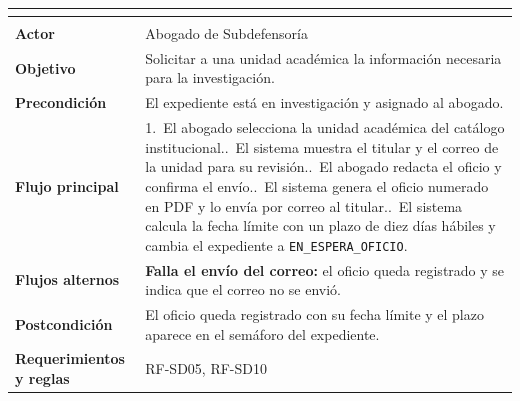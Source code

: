 \begingroup
{}
\small
\renewcommand{\arraystretch}{1.25}
\setlength{\tabcolsep}{4pt}
\begin{longtable}{|L{3.2cm}|L{12.4cm}|}
	\hline
	 \\
	\hline
	\endfirsthead
	\hline
	 \\
	\hline
	\endhead
	\textbf{Actor} & Abogado de Subdefensoría \\ \hline
	\textbf{Objetivo} & Solicitar a una unidad académica la información necesaria para la investigación. \\ \hline
	\textbf{Precondición} & El expediente está en investigación y asignado al abogado. \\ \hline
	\textbf{Flujo principal} & 1.~El abogado selecciona la unidad académica del catálogo institucional..~El sistema muestra el titular y el correo de la unidad para su revisión..~El abogado redacta el oficio y confirma el envío..~El sistema genera el oficio numerado en PDF y lo envía por correo al titular..~El sistema calcula la fecha límite con un plazo de diez días hábiles y cambia el expediente a \texttt{EN\_ESPERA\_OFICIO}. \\ \hline
	\textbf{Flujos alternos} & \textbf{Falla el envío del correo:} el oficio queda registrado y se indica que el correo no se envió. \\ \hline
	\textbf{Postcondición} & El oficio queda registrado con su fecha límite y el plazo aparece en el semáforo del expediente. \\ \hline
	\textbf{Requerimientos y reglas} & RF-SD05, RF-SD10 \\ \hline
\end{longtable}
\endgroup

